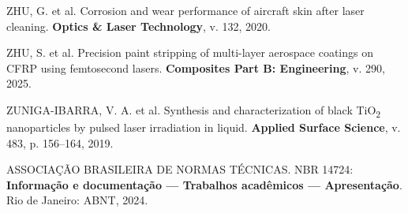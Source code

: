 \documentclass[
  12pt,
  a4paper,
  oneside,
  brazil,
  chapter=TITLE
]{article}
\begin{document}
ZHU, G. et al. Corrosion and wear performance of aircraft skin after laser cleaning. \textbf{Optics \& Laser Technology}, v. 132, 2020.

ZHU, S. et al. Precision paint stripping of multi-layer aerospace coatings on CFRP using femtosecond lasers. \textbf{Composites Part B: Engineering}, v. 290, 2025.

ZUNIGA-IBARRA, V. A. et al. Synthesis and characterization of black TiO\textsubscript{2} nanoparticles by pulsed laser irradiation in liquid. \textbf{Applied Surface Science}, v. 483, p. 156--164, 2019.

ASSOCIAÇÃO BRASILEIRA DE NORMAS TÉCNICAS. NBR 14724: \textbf{Informação e documentação --- Trabalhos acadêmicos --- Apresentação}. Rio de Janeiro: ABNT, 2024.
\end{document}
